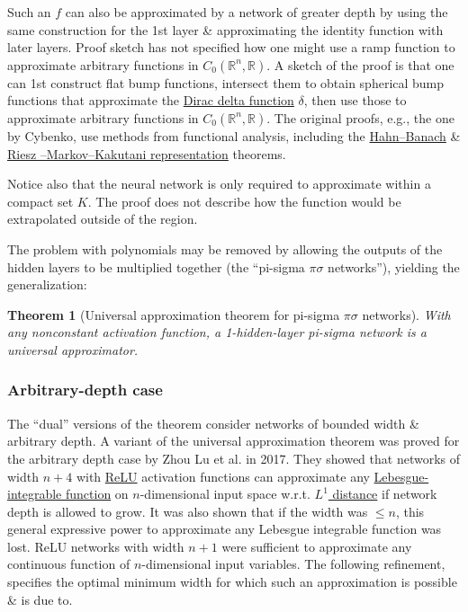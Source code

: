 \documentclass{article}
\newtheorem{theorem}{Theorem}
\begin{document}
Such an $f$ can also be approximated by a network of greater depth by using the same construction for the 1st layer \& approximating the identity function with later layers. {\sf Proof sketch} has not specified how one might use a ramp function to approximate arbitrary functions in $C_0(\mathbb{R}^n,\mathbb{R})$. A sketch of the proof is that one can 1st construct flat bump functions, intersect them to obtain spherical bump functions that approximate the \href{https://en.wikipedia.org/wiki/Dirac_delta_function}{Dirac delta function} $\delta$, then use those to approximate arbitrary functions in $C_0(\mathbb{R}^n,\mathbb{R})$. The original proofs, e.g., the one by Cybenko, use methods from functional analysis, including the \href{https://en.wikipedia.org/wiki/Hahn%E2%80%93Banach_theorem}{Hahn--Banach} \& \href{https://en.wikipedia.org/wiki/Riesz%E2%80%93Markov%E2%80%93Kakutani_representation_theorem}{Riesz --Markov--Kakutani representation} theorems.

Notice also that the neural network is only required to approximate within a compact set $K$. The proof does not describe how the function would be extrapolated outside of the region.

The problem with polynomials may be removed by allowing the outputs of the hidden layers to be multiplied together (the ``pi-sigma $\pi\sigma$ networks''), yielding the generalization:

\begin{theorem}[Universal approximation theorem for pi-sigma $\pi\sigma$ networks]
	With any nonconstant activation function, a 1-hidden-layer pi-sigma network is a universal approximator.
\end{theorem}

\subsubsection{Arbitrary-depth case}
The ``dual'' versions of the theorem consider networks of bounded width \& arbitrary depth. A variant of the universal approximation theorem was proved for the arbitrary depth case by Zhou Lu et al. in 2017. They showed that networks of width $n + 4$ with \href{https://en.wikipedia.org/wiki/ReLU}{ReLU} activation functions can approximate any \href{https://en.wikipedia.org/wiki/Lebesgue_integration}{Lebesgue-integrable function} on $n$-dimensional input space w.r.t. \href{https://en.wikipedia.org/wiki/L1_distance}{$L^1$ distance} if network depth is allowed to grow. It was also shown that if the width was $\le n$, this general expressive power to approximate any Lebesgue integrable function was lost. ReLU networks with width $n + 1$ were sufficient to approximate any continuous function of $n$-dimensional input variables. The following refinement, specifies the optimal minimum width for which such an approximation is possible \& is due to.
\end{document}

